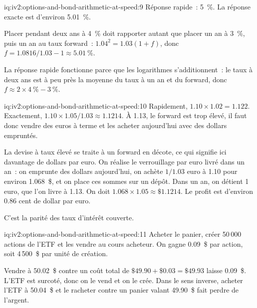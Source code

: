\begin{solution}{iq:iv2:options-and-bond-arithmetic-at-speed:9}
Réponse rapide~: 5~\%. La réponse exacte est d'environ 5.01~\%.

Placer pendant deux ans à 4~\% doit rapporter autant que placer un an à 3~\%, puis un an au taux forward~: $1.04^2 = 1.03(1 + f)$, donc $f = 1.0816/1.03 - 1 \approx 5.01~\%$.

La réponse rapide fonctionne parce que les logarithmes s'additionnent~: le taux à deux ans est à peu près la moyenne du taux à un an et du forward, donc $f \approx 2 \times 4~\% - 3~\%$.

\end{solution}

\begin{solution}{iq:iv2:options-and-bond-arithmetic-at-speed:10}
Rapidement, $1.10 \times 1.02 = 1.122$. Exactement, $1.10 \times 1.05/1.03 \approx 1.1214$. À 1.13, le forward est trop élevé, il faut donc vendre des euros à terme et les acheter aujourd'hui avec des dollars empruntés.

La devise à taux élevé se traite à un forward en décote, ce qui signifie ici davantage de dollars par euro. On réalise le verrouillage par euro livré dans un an~: on emprunte des dollars aujourd'hui, on achète $1/1.03$ euro à 1.10 pour environ 1.068~\$, et on place ces sommes sur un dépôt. Dans un an, on détient 1 euro, que l'on livre à 1.13. On doit $1.068 \times 1.05 \approx \$1.1214$. Le profit est d'environ 0.86 cent de dollar par euro.

C'est la parité des taux d'intérêt couverte.

\end{solution}

\begin{solution}{iq:iv2:options-and-bond-arithmetic-at-speed:11}
Acheter le panier, créer 50\,000 actions de l'ETF et les vendre au cours acheteur. On gagne 0.09~\$ par action, soit 4\,500~\$ par unité de création.

Vendre à 50.02~\$ contre un coût total de $\$49.90 + \$0.03 = \$49.93$ laisse 0.09~\$. L'ETF est surcoté, donc on le vend et on le crée. Dans le sens inverse, acheter l'ETF à 50.04~\$ et le racheter contre un panier valant 49.90~\$ fait perdre de l'argent.

\end{solution}

